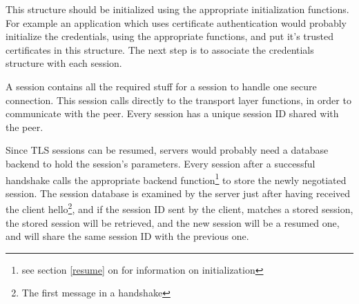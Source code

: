 This structure should be initialized using the appropriate initialization
functions. For example an application which uses certificate authentication
would probably initialize the credentials, using the appropriate functions,
and put it's trusted certificates in this structure. The next step is to
associate the credentials structure with each \tls{} session.

\par A \gnutls{} session contains all the required stuff for a
session to handle one secure connection. This session calls directly
to the transport layer functions, in order to communicate with the peer.
Every session has a unique session ID shared with the peer.

\par
Since TLS sessions can be resumed, servers would probably need a database
backend to hold the session's parameters. Every \gnutls{} session after
a successful handshake calls the appropriate backend function\footnote{see section \ref{resume}
on \pageref{resume} for information on initialization} to store the
newly negotiated session. The session database is examined by the server
just after having received the client hello\footnote{The first message
in a \tls{} handshake}, and if the session ID sent by the client,
matches a stored session, the stored session will be retrieved, and the
new session will be a resumed one, and will share the same session ID
with the previous one.




